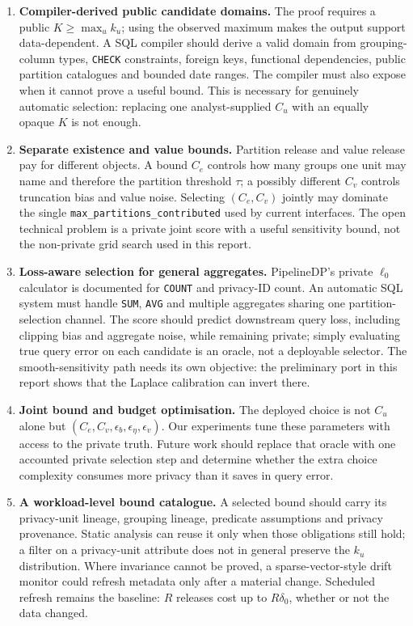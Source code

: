 \documentclass[11pt,a4paper]{article}
\newcommand{\Cu}{C_u}
\newcommand{\ku}{k_u}
\begin{document}
\begin{enumerate}
\item \textbf{Compiler-derived public candidate domains.} The proof requires a public
$K \ge \max_u \ku$; using the observed maximum makes the output support data-dependent. A SQL
compiler should derive a valid domain from grouping-column types, \texttt{CHECK} constraints,
foreign keys, functional dependencies, public partition catalogues and bounded date ranges. The
compiler must also expose when it cannot prove a useful bound. This is necessary for genuinely
automatic selection: replacing one analyst-supplied $\Cu$ with an equally opaque $K$ is not enough.

\item \textbf{Separate existence and value bounds.} Partition release and value release pay for
different objects. A bound $C_e$ controls how many groups one unit may name and therefore the
partition threshold $\tau$; a possibly different $C_v$ controls truncation bias and value noise.
Selecting $(C_e,C_v)$ jointly may dominate the single \texttt{max\_partitions\_contributed} used by
current interfaces. The open technical problem is a private joint score with a useful sensitivity
bound, not the non-private grid search used in this report.

\item \textbf{Loss-aware selection for general aggregates.} PipelineDP's private $\ell_0$
calculator is documented for \texttt{COUNT} and privacy-ID count. An automatic SQL system must
handle \texttt{SUM}, \texttt{AVG} and multiple aggregates sharing one partition-selection channel.
The score should predict downstream query loss, including clipping bias and aggregate noise, while
remaining private; simply evaluating true query error on each candidate is an oracle, not a
deployable selector. The smooth-sensitivity path needs its own objective: the preliminary port in
this report shows that the Laplace calibration can invert there.

\item \textbf{Joint bound and budget optimisation.} The deployed choice is not $\Cu$ alone but
$(C_e,C_v,\epsilon_b,\epsilon_\eta,\epsilon_v)$. Our experiments tune these parameters with access
to the private truth. Future work should replace that oracle with one accounted private selection
step and determine whether the extra choice complexity consumes more privacy than it saves in
query error.

\item \textbf{A workload-level bound catalogue.} A selected bound should carry its privacy-unit
lineage, grouping lineage, predicate assumptions and privacy provenance. Static analysis can reuse
it only when those obligations still hold; a filter on a privacy-unit attribute does not in general
preserve the $\ku$ distribution. Where invariance cannot be proved, a sparse-vector-style drift
monitor could refresh metadata only after a material change. Scheduled refresh remains the
baseline: $R$ releases cost up to $R\delta_0$, whether or not the data changed.


\end{enumerate}
\end{document}

